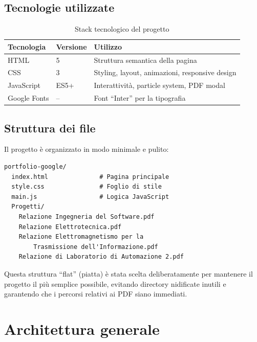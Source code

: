 \documentclass[a4paper,12pt]{report}
\begin{document}
\section{Tecnologie utilizzate}

\begin{table}[H]
\centering
\caption{Stack tecnologico del progetto}
\begin{tabularx}{\textwidth}{l l X}
\toprule
\textbf{Tecnologia} & \textbf{Versione} & \textbf{Utilizzo} \\
\midrule
HTML & 5 & Struttura semantica della pagina \\
CSS & 3 & Styling, layout, animazioni, responsive design \\
JavaScript & ES5+ & Interattivit\`a, particle system, PDF modal \\
Google Fonts & -- & Font ``Inter'' per la tipografia \\
\bottomrule
\end{tabularx}
\end{table}

\section{Struttura dei file}

Il progetto \`e organizzato in modo minimale e pulito:

\begin{lstlisting}[style=htmlstyle, caption={Struttura del progetto}, label={lst:structure}]
portfolio-google/
  index.html              # Pagina principale
  style.css               # Foglio di stile
  main.js                 # Logica JavaScript
  Progetti/
    Relazione Ingegneria del Software.pdf
    Relazione Elettrotecnica.pdf
    Relazione Elettromagnetismo per la
        Trasmissione dell'Informazione.pdf
    Relazione di Laboratorio di Automazione 2.pdf
\end{lstlisting}

Questa struttura ``flat'' (piatta) \`e stata scelta deliberatamente per mantenere il progetto il pi\`u semplice possibile, evitando directory nidificate inutili e garantendo che i percorsi relativi ai PDF siano immediati.


\chapter{Architettura generale}
\end{document}
